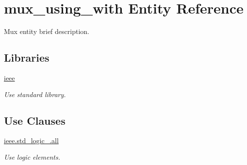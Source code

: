 \hypertarget{classmux__using__with}{\section{mux\-\_\-using\-\_\-with Entity Reference}
\label{classmux__using__with}
}


Mux entity brief description.  


\subsection*{Libraries}
 \begin{DoxyCompactItemize}
\item 
\hypertarget{classmux__using__with_a0a6af6eef40212dbaf130d57ce711256}{\hyperlink{classmux__using__with_a0a6af6eef40212dbaf130d57ce711256}{ieee} }\label{classmux__using__with_a0a6af6eef40212dbaf130d57ce711256}

\begin{DoxyCompactList}\small\item\em Use standard library. \end{DoxyCompactList}\end{DoxyCompactItemize}
\subsection*{Use Clauses}
 \begin{DoxyCompactItemize}
\item 
\hypertarget{classmux__using__with_a43ecb358105806229eb7a3074fc4d577}{\hyperlink{classmux__using__with_a43ecb358105806229eb7a3074fc4d577}{ieee.\-std\-\_\-logic\-\_.\-all}   }\label{classmux__using__with_a43ecb358105806229eb7a3074fc4d577}

\begin{DoxyCompactList}\small\item\em Use logic elements. \end{DoxyCompactList}\end{DoxyCompactItemize}
